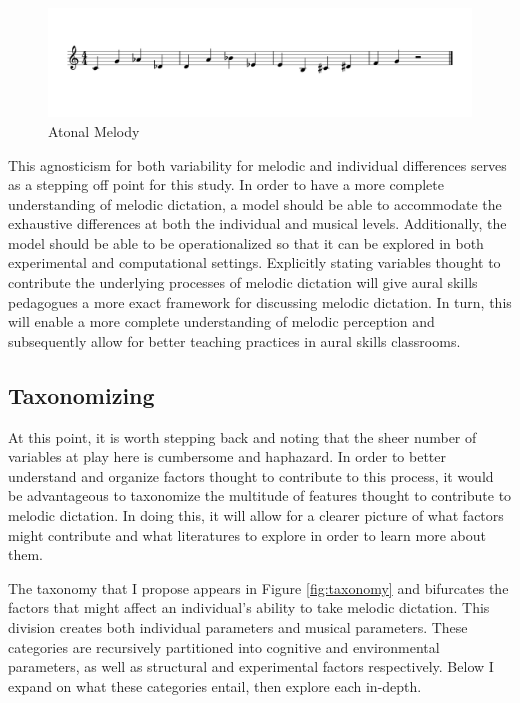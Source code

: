 \documentclass[12pt,]{book}
\begin{document}
\begin{figure}

{\centering \includegraphics[width=1\linewidth]{img/musicalexamples/MMD_Figure3-1} 

}

\caption{Atonal Melody}\label{fig:shortmelody2}
\end{figure}

This agnosticism for both variability for melodic and individual differences serves as a stepping off point for this study.
In order to have a more complete understanding of melodic dictation, a model should be able to accommodate the exhaustive differences at both the individual and musical levels.
Additionally, the model should be able to be operationalized so that it can be explored in both experimental and computational settings.
Explicitly stating variables thought to contribute the underlying processes of melodic dictation will give aural skills pedagogues a more exact framework for discussing melodic dictation.
In turn, this will enable a more complete understanding of melodic perception and subsequently allow for better teaching practices in aural skills classrooms.

\hypertarget{taxonomizing}{%
\subsection{Taxonomizing}\label{taxonomizing}}

At this point, it is worth stepping back and noting that the sheer number of variables at play here is cumbersome and haphazard.
In order to better understand and organize factors thought to contribute to this process, it would be advantageous to taxonomize the multitude of features thought to contribute to melodic dictation.
In doing this, it will allow for a clearer picture of what factors might contribute and what literatures to explore in order to learn more about them.

The taxonomy that I propose appears in Figure \ref{fig:taxonomy} and bifurcates the factors that might affect an individual's ability to take melodic dictation.
This division creates both individual parameters and musical parameters.
These categories are recursively partitioned into cognitive and environmental parameters, as well as structural and experimental factors respectively.
Below I expand on what these categories entail, then explore each in-depth.
\end{document}
